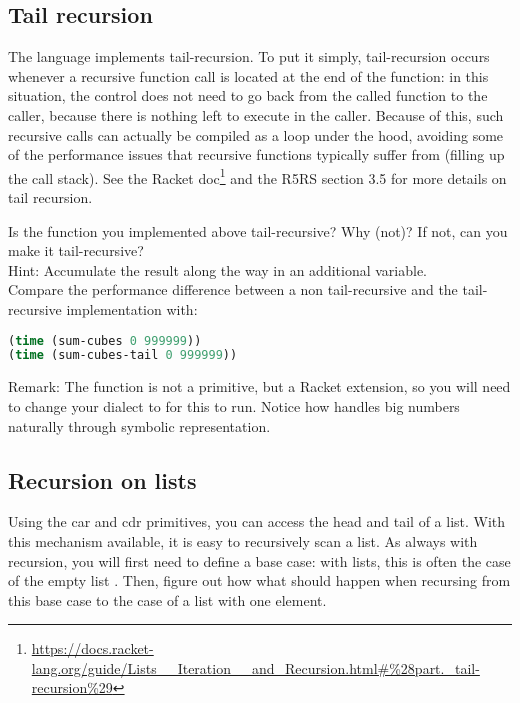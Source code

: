 \documentclass{../../../tp}
\begin{document}
\subsection{Tail recursion}

The \scheme language implements tail-recursion. To put it simply, tail-recursion occurs whenever a recursive function call is located at the end of the function: in this situation, the control does not need to go back from the called function to the caller, because there is nothing left to execute in the caller. Because of this, such recursive calls can actually be compiled as a loop under the hood, avoiding some of the performance issues that recursive functions typically suffer from (filling up the call stack). See the Racket doc\footnote{\url{https://docs.racket-lang.org/guide/Lists\_\_Iteration\_\_and\_Recursion.html\#\%28part._tail-recursion\%29}} and the R5RS section 3.5 for more details on tail recursion.

\begin{instruction}
Is the  function you implemented above tail-recursive? Why (not)? If not, can you make it tail-recursive?\\

Hint: Accumulate the result along the way in an additional variable.\\

Compare the performance difference between a non tail-recursive  and the tail-recursive implementation  with:

	\begin{lstlisting}[language=lisp]
(time (sum-cubes 0 999999))
(time (sum-cubes-tail 0 999999))
	\end{lstlisting}

Remark: The  function is not a \scheme primitive, but a Racket extension, so you will need to change your dialect to  for this to run. Notice how \scheme handles big numbers naturally through symbolic representation.
\end{instruction}


\subsection{Recursion on lists}

Using the car and cdr primitives, you can access the head and tail of a list. With this mechanism available, it is easy to recursively scan a list. As always with recursion, you will first need to define a base case: with lists, this is often the case of the empty list . Then, figure out how what should happen when recursing from this base case to the case of a list with one element.
\end{document}
